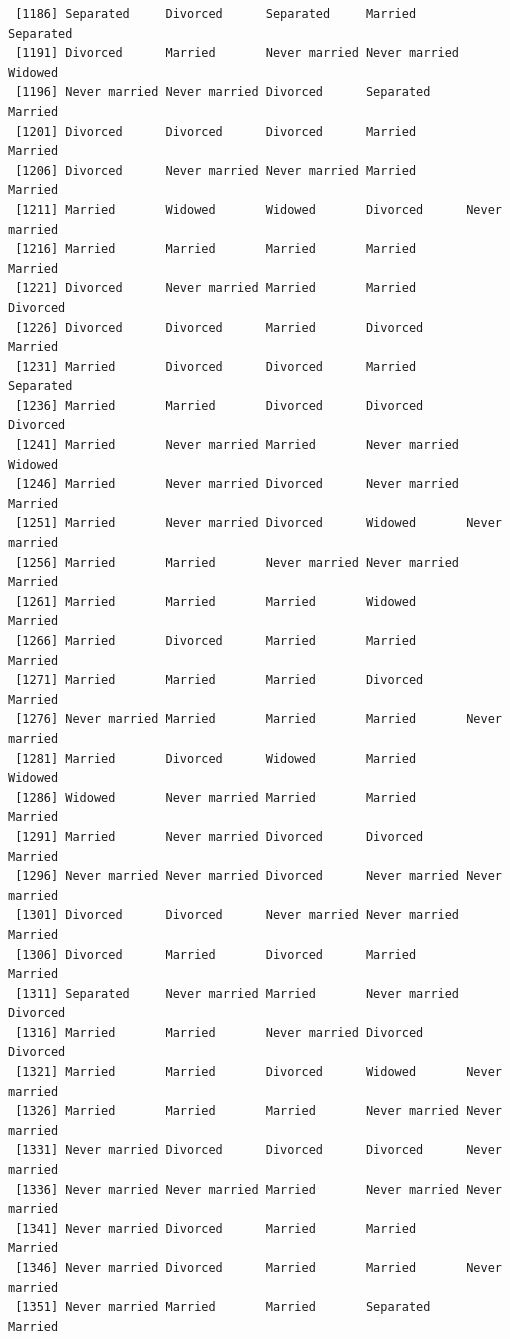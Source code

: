 \documentclass[
  letterpaper,
  DIV=11,
  numbers=noendperiod,
  oneside]{scrartcl}
\begin{document}
\begin{verbatim}
 [1186] Separated     Divorced      Separated     Married       Separated    
 [1191] Divorced      Married       Never married Never married Widowed      
 [1196] Never married Never married Divorced      Separated     Married      
 [1201] Divorced      Divorced      Divorced      Married       Married      
 [1206] Divorced      Never married Never married Married       Married      
 [1211] Married       Widowed       Widowed       Divorced      Never married
 [1216] Married       Married       Married       Married       Married      
 [1221] Divorced      Never married Married       Married       Divorced     
 [1226] Divorced      Divorced      Married       Divorced      Married      
 [1231] Married       Divorced      Divorced      Married       Separated    
 [1236] Married       Married       Divorced      Divorced      Divorced     
 [1241] Married       Never married Married       Never married Widowed      
 [1246] Married       Never married Divorced      Never married Married      
 [1251] Married       Never married Divorced      Widowed       Never married
 [1256] Married       Married       Never married Never married Married      
 [1261] Married       Married       Married       Widowed       Married      
 [1266] Married       Divorced      Married       Married       Married      
 [1271] Married       Married       Married       Divorced      Married      
 [1276] Never married Married       Married       Married       Never married
 [1281] Married       Divorced      Widowed       Married       Widowed      
 [1286] Widowed       Never married Married       Married       Married      
 [1291] Married       Never married Divorced      Divorced      Married      
 [1296] Never married Never married Divorced      Never married Never married
 [1301] Divorced      Divorced      Never married Never married Married      
 [1306] Divorced      Married       Divorced      Married       Married      
 [1311] Separated     Never married Married       Never married Divorced     
 [1316] Married       Married       Never married Divorced      Divorced     
 [1321] Married       Married       Divorced      Widowed       Never married
 [1326] Married       Married       Married       Never married Never married
 [1331] Never married Divorced      Divorced      Divorced      Never married
 [1336] Never married Never married Married       Never married Never married
 [1341] Never married Divorced      Married       Married       Married      
 [1346] Never married Divorced      Married       Married       Never married
 [1351] Never married Married       Married       Separated     Married      

\end{verbatim}
\end{document}
